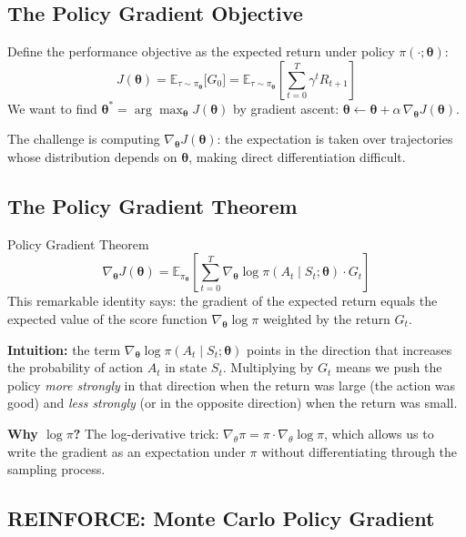\documentclass[11pt,a4paper]{article}
\newcommand{\E}{\mathbb{E}}
\begin{document}
\subsection{The Policy Gradient Objective}

Define the performance objective as the expected return under policy $\pi(\cdot;\boldsymbol{\theta})$:
\[
J(\boldsymbol{\theta}) = \E_{\tau\sim\pi_{\boldsymbol{\theta}}}\bigl[G_0\bigr] = \E_{\tau\sim\pi_{\boldsymbol{\theta}}}\!\left[\sum_{t=0}^T \gamma^t R_{t+1}\right]
\]
We want to find $\boldsymbol{\theta}^* = \arg\max_{\boldsymbol{\theta}} J(\boldsymbol{\theta})$ by gradient ascent: $\boldsymbol{\theta} \leftarrow \boldsymbol{\theta} + \alpha\,\nabla_{\boldsymbol{\theta}} J(\boldsymbol{\theta})$.

The challenge is computing $\nabla_{\boldsymbol{\theta}} J(\boldsymbol{\theta})$: the expectation is taken over trajectories whose distribution depends on $\boldsymbol{\theta}$, making direct differentiation difficult.

\subsection{The Policy Gradient Theorem}

\begin{thmbox}{Policy Gradient Theorem}
\[
\nabla_{\boldsymbol{\theta}} J(\boldsymbol{\theta}) = \E_{\pi_{\boldsymbol{\theta}}}\!\left[\sum_{t=0}^T \nabla_{\boldsymbol{\theta}}\log\pi(A_t\mid S_t;\boldsymbol{\theta})\cdot G_t\right]
\]
This remarkable identity says: the gradient of the expected return equals the expected value of the score function $\nabla_{\boldsymbol{\theta}}\log\pi$ weighted by the return $G_t$.
\end{thmbox}

\textbf{Intuition:} the term $\nabla_{\boldsymbol{\theta}}\log\pi(A_t\mid S_t;\boldsymbol{\theta})$ points in the direction that increases the probability of action $A_t$ in state $S_t$. Multiplying by $G_t$ means we push the policy \emph{more strongly} in that direction when the return was large (the action was good) and \emph{less strongly} (or in the opposite direction) when the return was small.

\textbf{Why $\log\pi$?} The log-derivative trick: $\nabla_\theta \pi = \pi \cdot \nabla_\theta \log\pi$, which allows us to write the gradient as an expectation under $\pi$ without differentiating through the sampling process.

\subsection{REINFORCE: Monte Carlo Policy Gradient}
\end{document}
